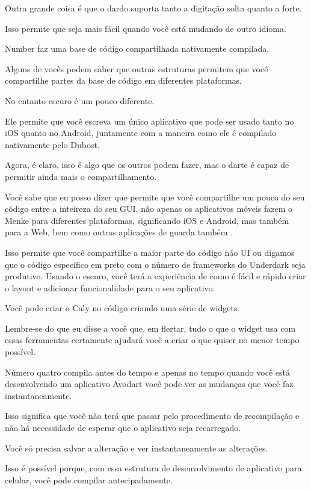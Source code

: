 Outra grande coisa é que o dardo suporta tanto a digitação solta quanto a forte.

Isso permite que seja mais fácil quando você está mudando de outro idioma.

Number faz uma base de código compartilhada nativamente compilada.

Alguns de vocês podem saber que outras estruturas permitem que você compartilhe partes da base de código em diferentes plataformas.

No entanto escuro é um pouco diferente.

Ele permite que você escreva um único aplicativo que pode ser usado tanto no iOS quanto no Android, juntamente com a maneira como ele é compilado nativamente pelo Dubost.

Agora, é claro, isso é algo que os outros podem fazer, mas o darte é capaz de permitir ainda mais o compartilhamento.

Você sabe que eu posso dizer que permite que você compartilhe um pouco do seu código entre a inteireza do seu GUI, não apenas os aplicativos móveis fazem o Menke para diferentes plataformas, significando iOS e Android, mas também para a Web, bem como outras aplicações de guarda também .

Isso permite que você compartilhe a maior parte do código não UI ou digamos que o código específico em preto com o número de frameworks do Underdark seja produtivo. Usando o escuro, você terá a experiência de como é fácil e rápido criar o layout e adicionar funcionalidade para o seu aplicativo.

Você pode criar o Caly no código criando uma série de widgets.

Lembre-se do que eu disse a você que, em flertar, tudo o que o widget usa com essas ferramentas certamente ajudará você a criar o que quiser no menor tempo possível.

Número quatro compila antes do tempo e apenas no tempo quando você está desenvolvendo um aplicativo Avodart você pode ver as mudanças que você faz instantaneamente.

Isso significa que você não terá que passar pelo procedimento de recompilação e não há necessidade de esperar que o aplicativo seja recarregado.

Você só precisa salvar a alteração e ver instantaneamente as alterações.

Isso é possível porque, com essa estrutura de desenvolvimento de aplicativo para celular, você pode compilar antecipadamente.

